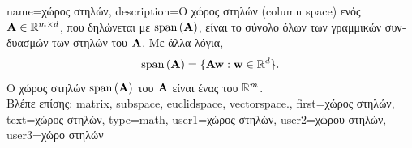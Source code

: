 {name={\foreignlanguage{greek}{χώρος στηλών}},
	description={\foreignlanguage{greek}{Ο χώρος στηλών} (column space) 
		\foreignlanguage{greek}{ενός}  ${\bf A} \in \mathbb{R}^{m \times d}$,
		\foreignlanguage{greek}{που δηλώνεται με ${\rm span}\left({\bf A} \right)$, είναι το σύνολο όλων των γραμμικών συνδυασμών 
		των στηλών του ${\bf A}$. Με άλλα λόγια,
		$$ {\rm span}\left({\bf A} \right) = \{ {\bf A} {\bf w} : {\bf w} \in \mathbb{R}^{d} \}. $$
		Ο χώρος στηλών ${\rm span}\left({\bf A} \right)$ του}  ${\bf A}$ 
		\foreignlanguage{greek}{είναι ένας}  \foreignlanguage{greek}{του} 
		 $\mathbb{R}^{m}$.
			   \\
		\foreignlanguage{greek}{Βλέπε επίσης:} \gls{matrix}, \gls{subspace}, \gls{euclidspace}, \gls{vectorspace}.},
	first={\foreignlanguage{greek}{χώρος στηλών}},
	text={\foreignlanguage{greek}{χώρος στηλών}},
	type=math,
	user1={\foreignlanguage{greek}{χώρος στηλών}}, %
  	user2={\foreignlanguage{greek}{χώρου στηλών}}, %
	user3={\foreignlanguage{greek}{χώρο στηλών}} %
}

